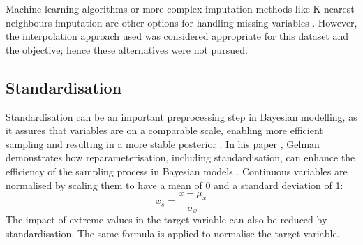 Machine learning algorithms or more complex imputation methods like K-nearest
neighbours imputation are other options for handling missing variables
\cite{knn}. However, the interpolation approach used was considered appropriate
for this dataset and the objective; hence these alternatives were not pursued.

\subsection{Standardisation}

Standardisation can be an important preprocessing step in Bayesian modelling,
as it assures that variables are on a comparable scale, enabling more efficient
sampling and resulting in a more stable posterior \cite{gelman2013philosophy}.
In his paper \cite{gelman2004parameterization}, Gelman demonstrates how
reparameterisation, including standardisation, can enhance the efficiency of
the sampling process in Bayesian models \cite{gelman2004parameterization}.
Continuous variables are normalised by scaling them to have a mean of 0 and a
standard deviation of 1:
\begin{equation}
  x_{s} = \frac{x - \mu_x}{\sigma_x}
\end{equation}
The impact of extreme values in the target variable can also be reduced by
standardisation. The same formula is applied to normalise the target variable. 

